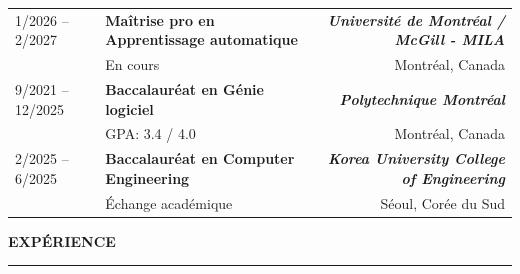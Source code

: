 \documentclass[a4paper,10pt]{article}
\begin{document}
    \begin{tabularx}{\textwidth}{@{}p{3cm} X r@{}}
        1/2026 -- 2/2027 & 
        \textbf{Maîtrise pro en Apprentissage automatique} 
        & \textbf{\textit{Université de Montréal / McGill  - MILA}} \\ 
        & En cours & 
        Montréal, Canada \\[0.2em]
        
        9/2021 -- 12/2025 & 
        \textbf{Baccalauréat en Génie logiciel} 
        & \textbf{\textit{Polytechnique Montréal}} \\ 
        & GPA: 3.4 / 4.0 & 
        Montréal, Canada \\[0.2em]
        
        2/2025 -- 6/2025 & 
        \textbf{Baccalauréat en Computer Engineering} 
        & \textbf{\textit{Korea University College of Engineering}} \\ 
        & Échange académique & 
        Séoul, Corée du Sud &
    \end{tabularx}
    
    \vspace{0.2em}
    \textbf{\large EXPÉRIENCE} \hspace{1em}\rule{\dimexpr\linewidth-8em}{0.4pt} \\[0em]
    
\end{document}
